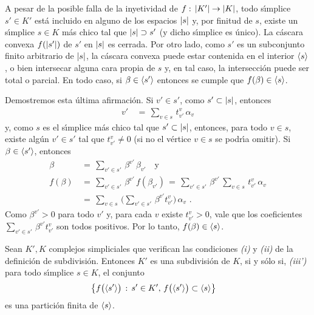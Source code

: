 \begin{obsDefinicionSubdivisiones}
	A pesar de la posible falla de la inyetividad de
	$f:\,\left|K'\right|\rightarrow\left|K\right|$, todo s\'{\i}mplice $s'\in K'$
	est\'{a} incluido en alguno de los espacios $\left|s\right|$ y, por
	finitud de $s$, existe un s\'{\i}mplice $s\in K$ m\'{a}s chico
	tal que $\left|s\right|\supset s'$ (y dicho s\'{\i}mplice es \'{u}nico).
	La c\'{a}scara convexa $f(\left|s'\right|)$ de $s'$ en $\left|s\right|$ es
	cerrada. Por otro lado, como $s'$ es un subconjunto finito arbitrario
	de $\left|s\right|$, la c\'{a}scara convexa puede estar contenida en el
	interior $\langle s\rangle$, o bien intersecar alguna cara propia de
	$s$ y, en tal caso, la intersecci\'{o}n puede ser total o parcial. En
	todo caso, si $\beta\in\langle s'\rangle$ entonces se cumple que
	$f(\beta)\in\langle s\rangle$.

	Demostremos esta \'{u}ltima afirmaci\'{o}n. Si $v'\in s'$, como
	$s'\subset\left|s\right|$, entonces
	\begin{align*}
		v' & \,=\,\sum_{v\in s}\,t_{v'}^{v}\,\alpha_{v}
	\end{align*}
	y, como $s$ es el s\'{\i}mplice m\'{a}s chico tal que
	$s'\subset\left|s\right|$, entonces, para todo $v\in s$, existe alg\'{u}n
	$v'\in s'$ tal que $t_{v'}^{v}\not=0$ (si no el v\'{e}rtice $v\in s$
	se podr\'{\i}a omitir). Si $\beta\in\langle s'\rangle$, entonces
	\begin{align*}
		\beta & \,=\,\sum_{v'\in s'}\,\beta^{v'}\,\beta_{v'}
			\quad\text{y} \\
		f(\beta) & \,=\,\sum_{v'\in s'}\,\beta^{v'}\,f(\beta_{v'})
			\,=\,\sum_{v'\in s'}\,\beta^{v'}\,
				\sum_{v\in s}\,t_{v'}^{v}\,\alpha_{v} \\
		& \,=\,\sum_{v\in s}\,
			\Big(\sum_{v'\in s'}\,\beta^{v'}t_{v'}^{v}\Big)\,
				\alpha_{v}
		\text{ .}
	\end{align*}
	Como $\beta^{v'}>0$ para todo $v'$ y, para cada $v$ existe
	$t_{v'}^{v}>0$, vale que los coeficientes
	$\sum_{v'\in s'}\,\beta^{v'}t_{v'}^{v}$ son todos positivos.
	Por lo tanto, $f(\beta)\in\langle s\rangle$.
\end{obsDefinicionSubdivisiones}

\begin{lemaSubdivisionEquivaleAParticion}%
	\label{thm:subdivisionequivaleaparticion}
	Sean $K',K$ complejos simpliciales que verifican las condiciones
	\emph{(i)} y \emph{(ii)} de la definici\'{o}n de subdivisi\'{o}n.
	Entonces $K'$ es una subdivisi\'{o}n de $K$, si y s\'{o}lo si,
	\emph{(iii')} para todo s\'{\i}mplice $s\in K$, el conjunto
	\begin{align*}
		& \big\{f\big(\langle s'\rangle\big)\,:\,
			s'\in K',\,f\big(\langle s'\rangle\big)\subset
				\langle s\rangle\big\}
	\end{align*}
	es una partici\'{o}n finita de $\langle s\rangle$.
\end{lemaSubdivisionEquivaleAParticion}

